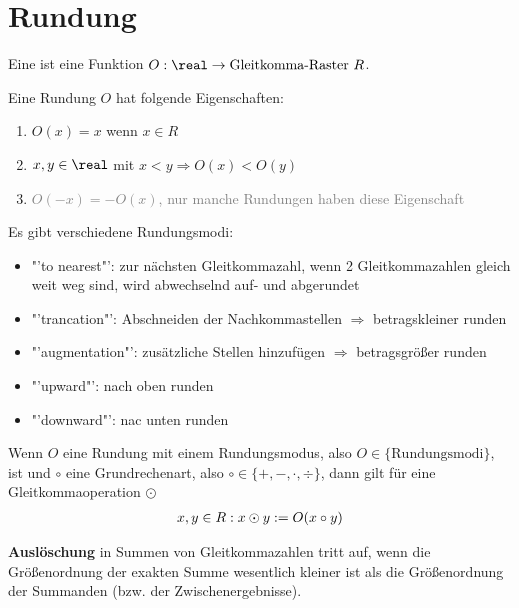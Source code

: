 \section{Rundung}

Eine  ist eine Funktion $O:\real\to\text{Gleitkomma-Raster }R$.

Eine Rundung $O$ hat folgende Eigenschaften:
\begin{enumerate}
	\item $O(x)=x$ wenn $x\in R$
	\item $x,y\in\real$ mit $x<y\Rightarrow O(x)<O(y)$
	\item \textcolor{Gray}{$O(-x)=-O(x)$, nur manche Rundungen haben diese Eigenschaft}
\end{enumerate}

Es gibt verschiedene Rundungsmodi:
\begin{itemize}
	\item "'to nearest"': zur nächsten Gleitkommazahl, wenn 2 Gleitkommazahlen gleich weit weg sind, wird abwechselnd auf- und abgerundet
	\item "'trancation"': Abschneiden der Nachkommastellen $\Rightarrow$ betragskleiner runden
	\item "'augmentation"': zusätzliche Stellen hinzufügen $\Rightarrow$ betragsgrößer runden
	\item "'upward"': nach oben runden
	\item "'downward"': nac unten runden
\end{itemize}

Wenn $O$ eine Rundung mit einem Rundungsmodus, also $O\in \{\text{Rundungsmodi}\}$, ist und $\circ$ eine Grundrechenart, also $\circ\in\{+,-,\cdot,\div\}$, dann gilt für eine Gleitkommaoperation $\odot$ 
\begin{align}
	x,y\in R: x\odot y := O(x\circ y)\notag
\end{align}

\textbf{Auslöschung} in Summen von Gleitkommazahlen tritt auf, wenn die Größenordnung der exakten Summe wesentlich kleiner ist als die Größenordnung der Summanden (bzw. der Zwischenergebnisse).